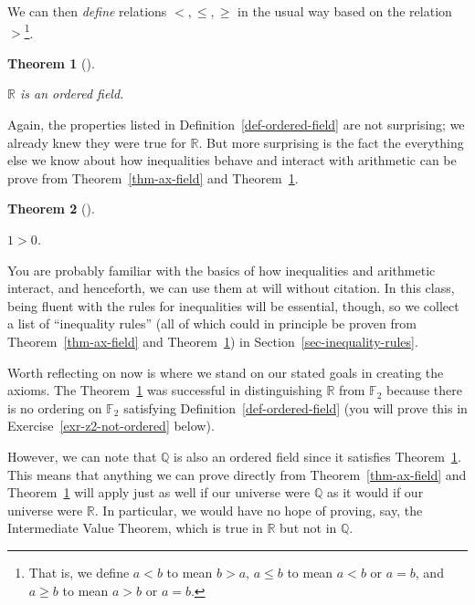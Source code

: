 \documentclass[
  letterpaper,
  DIV=11,
  numbers=noendperiod]{scrreprt}
\def\R{\mathbb R}
\theoremstyle{plain}
\newtheorem{theorem}{Theorem}[chapter]
\theoremstyle{definition}
\theoremstyle{plain}
\theoremstyle{plain}
\theoremstyle{definition}
\theoremstyle{definition}
\theoremstyle{remark}
\begin{document}
We can then \emph{define} relations \(<,\leq,\geq\) in the usual way
based on the relation \(>\)\footnote{That is, we define \(a<b\) to mean
  \(b>a\), \(a\leq b\) to mean \(a<b\) or \(a=b\), and \(a\geq b\) to
  mean \(a>b\) or \(a=b\).}.

\begin{theorem}[]\protect\hypertarget{thm-ax-ordered-field}{}\label{thm-ax-ordered-field}

\(\R\) is an ordered field.

\end{theorem}

Again, the properties listed in Definition~\ref{def-ordered-field} are
not surprising; we already knew they were true for \(\R\). But more
surprising is the fact the everything else we know about how
inequalities behave and interact with arithmetic can be prove from
Theorem~\ref{thm-ax-field} and Theorem~\ref{thm-ax-ordered-field}.

\begin{theorem}[]\protect\hypertarget{thm-one-greater-than-zero}{}\label{thm-one-greater-than-zero}

\(1>0\).

\end{theorem}

You are probably familiar with the basics of how inequalities and
arithmetic interact, and henceforth, we can use them at will without
citation. In this class, being fluent with the rules for inequalities
will be essential, though, so we collect a list of ``inequality rules''
(all of which could in principle be proven from
Theorem~\ref{thm-ax-field} and Theorem~\ref{thm-ax-ordered-field}) in
Section~\ref{sec-inequality-rules}.

Worth reflecting on now is where we stand on our stated goals in
creating the axioms. The Theorem~\ref{thm-ax-ordered-field} was
successful in distinguishing \(\R\) from \(\mathbb{F}_2\) because there
is no ordering on \(\mathbb{F}_2\) satisfying
Definition~\ref{def-ordered-field} (you will prove this in
Exercise~\ref{exr-z2-not-ordered} below).

However, we can note that \(\mathbb{Q}\) is also an ordered field since
it satisfies Theorem~\ref{thm-ax-ordered-field}. This means that
anything we can prove directly from Theorem~\ref{thm-ax-field} and
Theorem~\ref{thm-ax-ordered-field} will apply just as well if our
universe were \(\mathbb{Q}\) as it would if our universe were
\(\mathbb{R}\). In particular, we would have no hope of proving, say,
the Intermediate Value Theorem, which is true in \(\mathbb{R}\) but not
in \(\mathbb{Q}\).
\end{document}
